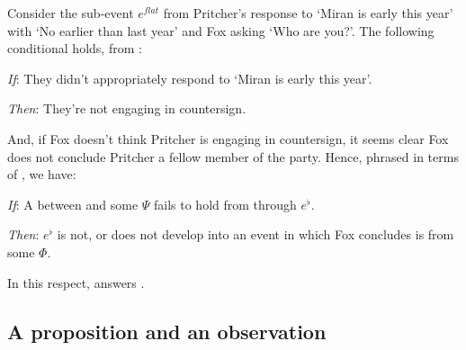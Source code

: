 \begin{note}
  Consider the sub-event \(e^{flat}\) from Pritcher's response to `Miran is early this year' with `No earlier than last year' and Fox asking `Who are you?'.
  The following conditional holds, from :
  \begin{itenum}
  \item[\emph{If}:]
    They didn't appropriately respond to `Miran is early this year'.
  \item[\emph{Then}:]
    They're not engaging in countersign.
  \end{itenum}
  And, if Fox doesn't think Pritcher is engaging in countersign, it seems clear Fox does not conclude Pritcher a fellow member of the party.
  Hence, phrased in terms of \ros{}, we have:
  \begin{itenum}
  \item[\emph{If}:]
    A \ros{} between  and some \pool{} \(\Psi\) fails to hold from  through \(e^{\flat}\).
  \item[\emph{Then}:]
    \(e^{\flat}\) is not, or does not develop into an event in which Fox concludes  is  from some \pool{} \(\Phi\).
  \end{itenum}
  In this respect, \ros{} answers \qWhy{}.
\end{note}

\subsection*{A proposition and an observation}

